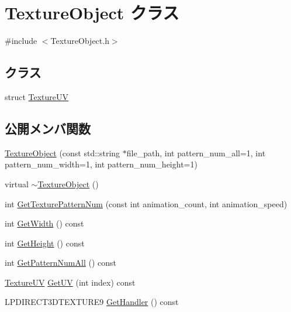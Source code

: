 \hypertarget{class_texture_object}{}\section{Texture\+Object クラス}
\label{class_texture_object}


{\ttfamily \#include $<$Texture\+Object.\+h$>$}

\subsection*{クラス}
\begin{DoxyCompactItemize}
\item 
struct \mbox{\hyperlink{struct_texture_object_1_1_texture_u_v}{Texture\+UV}}
\end{DoxyCompactItemize}
\subsection*{公開メンバ関数}
\begin{DoxyCompactItemize}
\item 
\mbox{\hyperlink{class_texture_object_add74bde2c60ec3d61229ce70b26602f2}{Texture\+Object}} (const std\+::string $\ast$file\+\_\+path, int pattern\+\_\+num\+\_\+all=1, int pattern\+\_\+num\+\_\+width=1, int pattern\+\_\+num\+\_\+height=1)
\item 
virtual \mbox{\hyperlink{class_texture_object_aeed25fa5ca8e892b96145f4a649e090a}{$\sim$\+Texture\+Object}} ()
\item 
int \mbox{\hyperlink{class_texture_object_a5bfee4b09a77e078a51117363a6ede34}{Get\+Texture\+Pattern\+Num}} (const int animation\+\_\+count, int animation\+\_\+speed)
\item 
int \mbox{\hyperlink{class_texture_object_a72c079770e7e4355b6481d28a0a472ac}{Get\+Width}} () const
\item 
int \mbox{\hyperlink{class_texture_object_af312bd8d8cdb31918a00e1fe096c26e0}{Get\+Height}} () const
\item 
int \mbox{\hyperlink{class_texture_object_a7d6efe951d81051ed4c763db1208aa40}{Get\+Pattern\+Num\+All}} () const
\item 
\mbox{\hyperlink{struct_texture_object_1_1_texture_u_v}{Texture\+UV}} \mbox{\hyperlink{class_texture_object_a51b8a2723302c2d38624a62f9205c4bb}{Get\+UV}} (int index) const
\item 
L\+P\+D\+I\+R\+E\+C\+T3\+D\+T\+E\+X\+T\+U\+R\+E9 \mbox{\hyperlink{class_texture_object_a1b6c93f36e03686f7198b93355c73c8a}{Get\+Handler}} () const
\end{DoxyCompactItemize}

